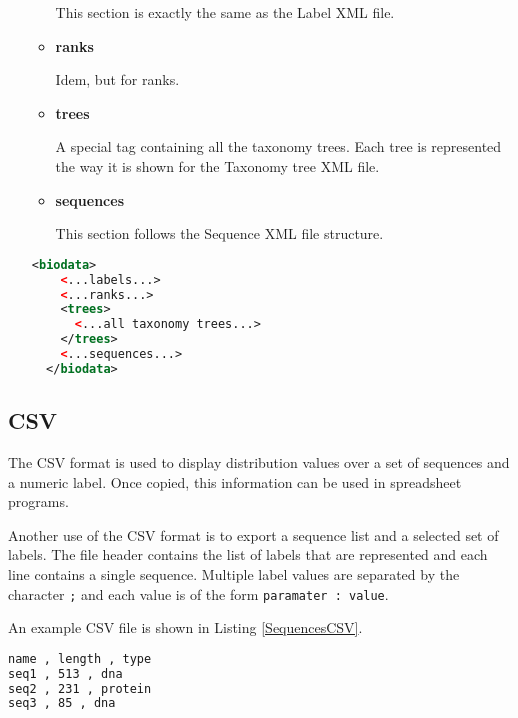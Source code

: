 \begin{itemize}
\begin{itemize}
    This section is exactly the same as the Label XML file.
    
    \item \textbf{ranks}
    
    Idem, but for ranks.
    
    \item \textbf{trees}
    
    A special tag containing all the taxonomy trees. Each tree is represented the way it is shown for the Taxonomy tree XML file.
    
    \item \textbf{sequences}
    
    This section follows the Sequence XML file structure.
    
  \end{itemize}

  \begin{lstlisting}[float, language=xml, frame=single, label=DatabaseXmlFile, caption={Database in XML skeleton.}]
  <biodata>
    <...labels...>
    <...ranks...>
    <trees>
      <...all taxonomy trees...>
    </trees>
    <...sequences...>
  </biodata>
  \end{lstlisting}

\end{itemize}

\subsection{CSV}

The CSV format is used to display distribution values over a set
of sequences and a numeric label. Once copied, this information can be used in spreadsheet programs.

Another use of the CSV format is to export a sequence list and a selected set of labels.
The file header contains the list of labels that are represented and each line contains a single
sequence. Multiple label values are separated by the character \texttt{;} and each value is of
the form \texttt{paramater : value}.

An example CSV file is shown in Listing \ref{SequencesCSV}.

\begin{lstlisting}[float, language=bash, frame=single, label=SequencesCSV, caption={An example CSV file.}]
name , length , type
seq1 , 513 , dna
seq2 , 231 , protein
seq3 , 85 , dna
\end{lstlisting}